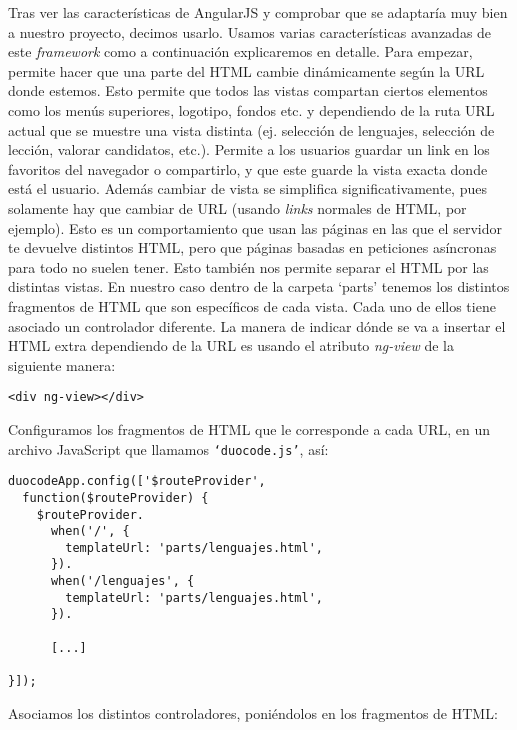 Tras ver las características de AngularJS y comprobar que se adaptaría muy bien a nuestro proyecto, decimos usarlo. Usamos varias características avanzadas de este \emph{framework} como a continuación explicaremos en detalle. Para empezar, permite hacer que una parte del HTML cambie dinámicamente según la URL donde estemos. Esto permite que todos las vistas compartan ciertos elementos como los menús superiores, logotipo, fondos etc. y dependiendo de la ruta URL actual que se muestre una vista distinta (ej. selección de lenguajes, selección de lección, valorar candidatos, etc.). Permite a los usuarios guardar un link en los favoritos del navegador o compartirlo, y que este guarde la vista exacta donde está el usuario. Además cambiar de vista se simplifica significativamente, pues solamente hay que cambiar de URL (usando \emph{links} normales de HTML, por ejemplo). Esto es un comportamiento que usan las páginas en las que el servidor te devuelve distintos HTML, pero que páginas basadas en peticiones asíncronas para todo no suelen tener. Esto también nos permite separar el HTML por las distintas vistas. En nuestro caso dentro de la carpeta `parts' tenemos los distintos fragmentos de HTML que son específicos de cada vista. Cada uno de ellos tiene asociado un controlador diferente. La manera de indicar dónde se va a insertar el HTML extra dependiendo de la URL es usando el atributo \emph{ng-view} de la siguiente manera:

{\codesize
\begin{verbatim}
<div ng-view></div>
\end{verbatim}
}

Configuramos los fragmentos de HTML que le corresponde a cada URL, en un archivo JavaScript que llamamos \texttt{`duocode.js'}, así:

\vspace{1em}
{\codesize
\lstset{}
\begin{lstlisting}[frame=single]
duocodeApp.config(['$routeProvider',
  function($routeProvider) {
    $routeProvider.
      when('/', {
        templateUrl: 'parts/lenguajes.html',
      }).
      when('/lenguajes', {
        templateUrl: 'parts/lenguajes.html',
      }).
      
      [...] 
      
}]);
\end{lstlisting}
}
\vspace{1em}

Asociamos los distintos controladores, poniéndolos en los fragmentos de HTML:

